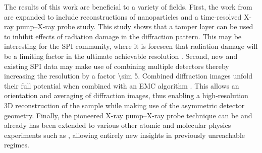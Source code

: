 %
The results of this work are beneficial to a variety of fields. First, the work from \citep{Hoener-2008-JPB,Gorkhover-2016-NatPho} are expanded to include reconstructions of nanoparticles and a time-resolved X-ray pump--X-ray probe study. This study shows that a tamper layer can be used to inhibit effects of radiation damage in the diffraction pattern. This may be interesting for the SPI community, where it is foreseen that radiation damage will be a limiting factor in the ultimate achievable resolution \citep{Aquila-2015-StrucDyn}. Second, new and existing SPI data may make use of combining multiple detectors thereby increasing the resolution by a factor \num{\sim 5}. Combined diffraction images unfold their full potential when combined with an EMC algorithm \citep{Loh-2009-PRE}. This allows an orientation and averaging of diffraction images, thus enabling a high-resolution 3D reconstruction of the sample while making use of the asymmetric detector geometry. Finally, the pioneered X-ray pump--X-ray probe technique can be and already has been extended to various other atomic and molecular physics experiments such as \cite{Lehmann-2016-PRA,Kimberg-2016-FD,Al-Haddad-2017-unpublished,Ferguson-2016-SciAdv,Picon-2016-NatComm}, allowing entirely new insights in previously unreachable regimes.
%
%
%